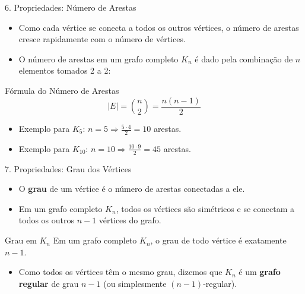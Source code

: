 \documentclass[9pt]{beamer}
\begin{document}
    \begin{frame}{6. Propriedades: Número de Arestas}
        \begin{itemize}
            \item Como cada vértice se conecta a todos os outros vértices, o número de arestas cresce rapidamente com o número de vértices.
            \item O número de arestas em um grafo completo $K_n$ é dado pela combinação de $n$ elementos tomados 2 a 2:
        \end{itemize}
        \begin{block}{Fórmula do Número de Arestas}
            \[ |E| = \binom{n}{2} = \frac{n(n-1)}{2} \]
        \end{block}
        \begin{itemize}
            \item Exemplo para $K_5$: $n=5 \Rightarrow \frac{5 \cdot 4}{2} = 10$ arestas.
            \item Exemplo para $K_{10}$: $n=10 \Rightarrow \frac{10 \cdot 9}{2} = 45$ arestas.
        \end{itemize}
    \end{frame}

    \begin{frame}{7. Propriedades: Grau dos Vértices}
        \begin{itemize}
            \item O \textbf{grau} de um vértice é o número de arestas conectadas a ele.
            \item Em um grafo completo $K_n$, todos os vértices são simétricos e se conectam a todos os outros $n-1$ vértices do grafo.
        \end{itemize}
        \begin{block}{Grau em $K_n$}
            Em um grafo completo $K_n$, o grau de todo vértice é exatamente \textbf{$n - 1$}.
        \end{block}
        \begin{itemize}
            \item Como todos os vértices têm o mesmo grau, dizemos que $K_n$ é um \textbf{grafo regular} de grau $n-1$ (ou simplesmente $(n-1)$-regular).
        \end{itemize}
    \end{frame}
\end{document}

